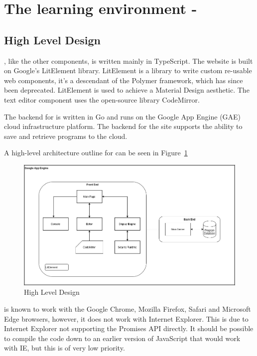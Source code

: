 \section{The learning environment - \trys{}}

\subsection{High Level Design}

\trys{}, like the other components, is written mainly in TypeScript. The website is built on Google's LitElement library. LitElement is a library to write custom re-usable web components, it's a descendant of the Polymer framework, which has since been deprecated. LitElement is used to achieve a Material Design aesthetic. The text editor component uses the open-source library CodeMirror.

The backend for \trys{} is written in Go and runs on the Google App Engine (GAE) cloud infrastructure platform. The backend for the site supports the ability to save and retrieve \Setanta{} programs to the cloud.

A high-level architecture outline for \trys{} can be seen in Figure~\ref{trysetantadiagram}

\begin{figure}
    \caption{\trys{} High Level Design}
    \label{trysetantadiagram}
    \begin{center}
    \includegraphics[scale=0.4]{trysetantadiagram}
    \end{center}
\end{figure}

\trys{} is known to work with the Google Chrome, Mozilla Firefox, Safari and Microsoft Edge browsers, however, it does not work with Internet Explorer. This is due to Internet Explorer not supporting the Promises API directly. It should be possible to compile the code down to an earlier version of JavaScript that would work with IE, but this is of very low priority.

